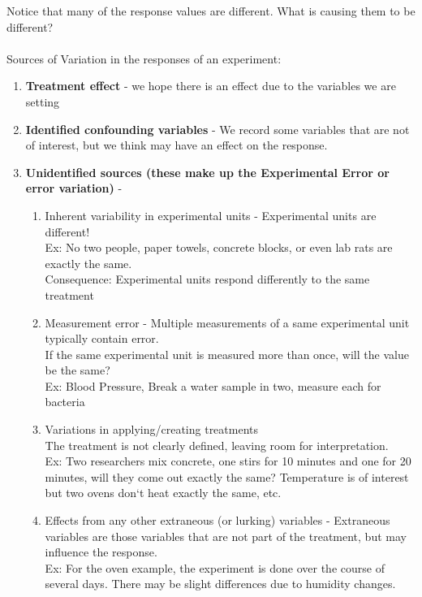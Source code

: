 \documentclass{report}
\begin{document}
\newpage

Notice that many of the response values are different.  What is causing them to be different?\\~\\
Sources of Variation in the responses of an experiment:
\begin{enumerate}
\item \textbf{Treatment effect} - we hope there is an effect due to the variables we are setting
\item \textbf{Identified confounding variables} - We record some variables that are not of interest, but we think may have an effect on the response.
\item \textbf{Unidentified sources (these make up the Experimental Error or error variation)} -
		\begin{enumerate}
			\item Inherent variability in experimental units - Experimental units are different! \\
		Ex: No two people, paper towels, concrete blocks, or even lab rats are exactly the same.\\
		Consequence: Experimental units respond differently to the same treatment
			\item Measurement error - Multiple measurements of a same experimental unit typically contain error.\\
			If the same experimental unit is measured more than once, will the value be the same?\\
			Ex: Blood Pressure, Break a water sample in two, measure each for bacteria
			\item Variations in applying/creating treatments\\
		The treatment is not clearly defined, leaving room for interpretation.  \\
			Ex:  Two researchers mix concrete, one stirs for 10 minutes and one for 20 minutes, will they come out exactly the same? Temperature is of interest but two ovens don`t heat exactly the same, etc.
			\item Effects from any other extraneous (or lurking) variables - Extraneous variables are those variables that are not part of the treatment, but may influence the response.\\
			Ex: For the oven example, the experiment is done over the course of several days.  There may be slight differences due to humidity changes.
		\end{enumerate}
\end{enumerate}
\end{document}
